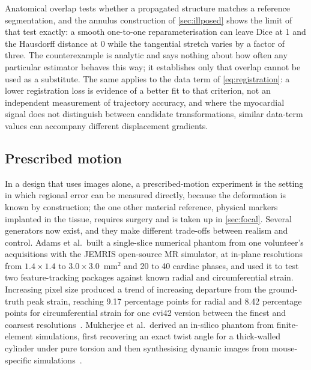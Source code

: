 Anatomical overlap tests whether a propagated structure matches a reference segmentation, and the
annulus construction of \cref{sec:illposed} shows the limit of that test exactly: a smooth
one-to-one reparameterisation can leave Dice at 1 and the Hausdorff distance at 0 while the
tangential stretch varies by a factor of three. The counterexample is analytic and says nothing
about how often any particular estimator behaves this way; it establishes only that overlap cannot
be used as a substitute. The same applies to the data term of \cref{eq:registration}: a lower
registration loss is evidence of a better fit to that criterion, not an independent measurement of
trajectory accuracy, and where the myocardial signal does not distinguish between candidate
transformations, similar data-term values can accompany different displacement gradients.

\subsection{Prescribed motion}\label{sec:prescribed}

In a design that uses images alone, a prescribed-motion experiment is the setting in which regional
error can be measured directly, because the deformation is known by construction; the one other
material reference, physical markers implanted in the tissue, requires surgery and is taken up in
\cref{sec:focal}. Several generators now exist, and they make
different trade-offs between realism and control. Adams et al.\ built a single-slice numerical
phantom from one volunteer's acquisitions with the JEMRIS open-source MR
simulator, at in-plane resolutions from
$1.4\times1.4$ to $3.0\times3.0$~mm$^2$ and 20 to 40 cardiac phases, and used it to test two
feature-tracking packages against known radial and circumferential strain. Increasing pixel size
produced a trend of increasing departure from the ground-truth peak strain, reaching 9.17 percentage
points for radial and 8.42 percentage points for circumferential strain for one cvi42 version
between the finest and coarsest resolutions~\citep{adams2023}. Mukherjee et al.\ derived an
in-silico phantom from finite-element simulations, first recovering an exact twist angle for a
thick-walled cylinder under pure torsion and then synthesising dynamic images from mouse-specific
simulations~\citep{mukherjee2024}.

